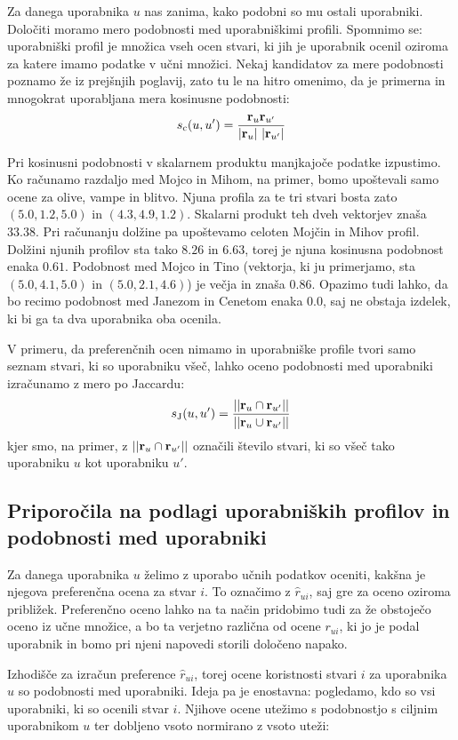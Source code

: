 Za danega uporabnika $u$ nas zanima, kako podobni so mu ostali uporabniki. Določiti moramo mero podobnosti med uporabniškimi profili. Spomnimo se: uporabniški profil je množica vseh ocen stvari, ki jih je uporabnik ocenil oziroma za katere imamo podatke v učni množici. Nekaj kandidatov za mere podobnosti poznamo že iz prejšnjih poglavij, zato tu le na hitro omenimo, da je primerna in mnogokrat uporabljana mera kosinusne podobnosti:
%
$$ s_{\rm c}(u,u')={{\bf r}_u {\bf r}_{u'} \over |{\bf r}_u|\ |{\bf r}_{u'}|}$$
%

Pri kosinusni podobnosti v skalarnem produktu manjkajoče podatke izpustimo. Ko računamo razdaljo med Mojco in Mihom, na primer, bomo upoštevali samo ocene za olive, vampe in blitvo. Njuna profila za te tri stvari bosta zato $(5.0, 1.2, 5.0)$ in $(4.3, 4.9, 1.2)$. Skalarni produkt teh dveh vektorjev znaša $33.38$. Pri računanju dolžine pa upoštevamo celoten Mojčin in Mihov profil. Dolžini njunih profilov sta tako $8.26$ in $6.63$, torej je njuna kosinusna podobnost enaka $0.61$. Podobnost med Mojco in Tino (vektorja, ki ju primerjamo, sta $(5.0, 4.1, 5.0)$ in $(5.0, 2.1, 4.6)$) je večja in znaša $0.86$. Opazimo tudi lahko, da bo recimo podobnost med Janezom in Cenetom enaka $0.0$, saj ne obstaja izdelek, ki bi ga ta dva uporabnika oba ocenila.

V primeru, da preferenčnih ocen nimamo in uporabniške profile tvori samo seznam stvari, ki so uporabniku všeč, lahko oceno podobnosti med uporabniki izračunamo z mero po Jaccardu:
%
$$ s_{\rm J}(u, u')={||{\bf r}_u\cap{\bf r}_{u'}|| \over ||{\bf r}_u\cup{\bf r}_{u'}||}$$
kjer smo, na primer, z $||{\bf r}_u\cap{\bf r}_{u'}||$ označili število stvari, ki so všeč tako uporabniku $u$ kot uporabniku $u'$.

\subsection{Priporočila na podlagi uporabniških profilov in podobnosti med uporabniki}

Za danega uporabnika $u$ želimo z uporabo učnih podatkov oceniti, kakšna je njegova preferenčna ocena za stvar $i$. To označimo z $\hat{r}_{ui}$, saj gre za oceno oziroma približek. Preferenčno oceno lahko na ta način pridobimo tudi za že obstoječo oceno iz učne množice, a bo ta verjetno različna od ocene $r_{ui}$, ki jo je podal uporabnik in bomo pri njeni napovedi storili določeno napako.

Izhodišče za izračun preference $\hat{r}_{ui}$, torej ocene koristnosti stvari $i$ za uporabnika $u$ so podobnosti med uporabniki. Ideja pa je enostavna: pogledamo, kdo so vsi uporabniki, ki so ocenili stvar $i$. Njihove ocene utežimo s podobnostjo s ciljnim uporabnikom $u$ ter dobljeno vsoto normirano z vsoto uteži:

